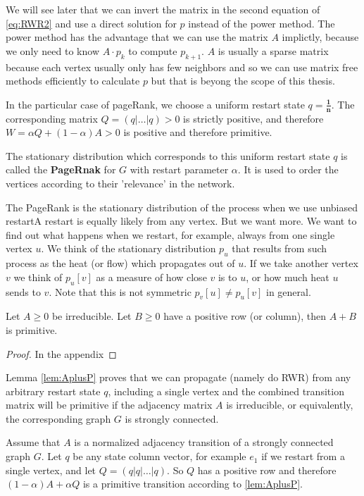 We will see later that we can invert the matrix in the second
equation of \ref{eq:RWR2} and use a direct solution for $p$ instead of
the power method. The power method has the advantage that we can use
the matrix $A$ implictly, because we only need to know $A \cdot p_k$
to compute $p_{k+1}$. $A$ is usually a sparse matrix because each
vertex usually only has few neighbors and so we can use matrix free
methods efficiently to calculate $p$ but that is beyong the scope of
this thesis.

In the particular case of pageRank, we choose a uniform restart
state $q = \mathbf{\frac{1}{n}}$. The corresponding matrix $Q =
(q|\dots|q) \gt 0$ is strictly positive, and therefore 
$W = \alpha Q + (1 - \alpha)A > 0$ is positive and therefore
primitive.

The stationary distribution which corresponds to this uniform
restart state $q$ is called the \textbf{PageRnak} for $G$ with
restart parameter $\alpha$. It is used to order the vertices
according to their 'relevance' in the network.



The PageRank is the stationary distribution of the process when we use unbiased
restart\textemdash A restart is equally likely from any vertex.
But we want more. We want to find out what happens when we restart, for example,
always from one single vertex $u$. We think of the stationary distribution $p_u$ that 
results from such process as the heat (or flow) which propagates out of $u$.
If we take another vertex $v$ we think of $p_u[v]$ as a measure of how close $v$
is to $u$, or how much heat $u$ sends to $v$.
Note that this is not symmetric $p_v[u] \neq p_u[v]$ in general.


\begin{lemma}
\label{lem:AplusP}
Let $A \geq 0$ be irreducible. Let $B \geq 0$ have a positive row (or column),
then $A + B$ is primitive.
\begin{proof}
In the appendix
\end{proof}
\end{lemma}

\begin{remark}
\label{rem:AplusP}
Lemma \ref{lem:AplusP} proves that we can propagate (namely do RWR) from any arbitrary restart
state $q$, including a single vertex and the combined transition matrix will be
primitive if the adjacency matrix $A$ is irreducible, or
equivalently, the corresponding graph $G$ is strongly connected.


Assume that $A$ is a normalized adjacency transition of a strongly
connected graph $G$.
Let $q$ be any state column vector, for example $e_1$ if we restart
from a single vertex, and let $Q = (q | q | \dots | q)$.
So $Q$ has a positive row and therefore $(1-\alpha)A + \alpha Q$ is a primitive
transition according to \ref{lem:AplusP}.

\end{remark}

